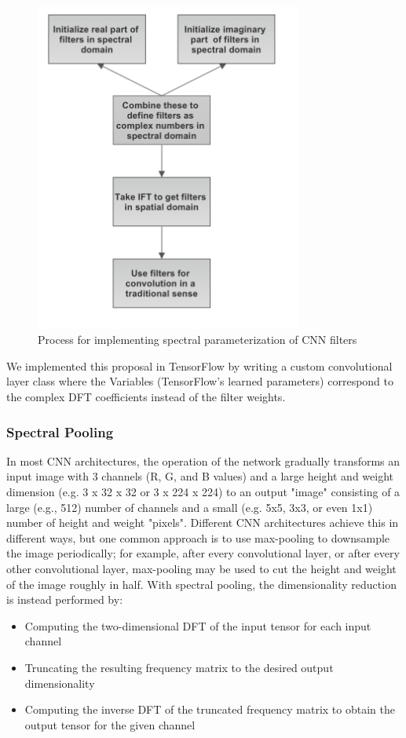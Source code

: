 \documentclass[10pt,journal,compsoc]{IEEEtran}
\begin{document}
\begin{figure}[ht]
\centering
  \includegraphics[width=250pt]{images/fc_spectral_param.png}
  \caption{Process for implementing spectral parameterization of CNN filters}
  \label{fig:spec_param}
\end{figure}

We implemented this proposal in TensorFlow by writing a custom convolutional layer class where the Variables (TensorFlow's learned parameters) correspond to the complex DFT coefficients instead of the filter weights.

\subsubsection{Spectral Pooling}

In most CNN architectures, the operation of the network gradually transforms an input image with 3 channels (R, G, and B values) and a large height and weight dimension (e.g. 3 x 32 x 32 or 3 x 224 x 224) to an output "image" consisting of a large (e.g., 512) number of channels and a small (e.g. 5x5, 3x3, or even 1x1) number of height and weight "pixels". Different CNN architectures achieve this in different ways, but one common approach is to use max-pooling to downsample the image periodically; for example, after every convolutional layer, or after every other convolutional layer, max-pooling may be used to cut the height and weight of the image roughly in half. With spectral pooling, the dimensionality reduction is instead performed by:
\begin{itemize}
\item Computing the two-dimensional DFT of the input tensor for each input channel
\item Truncating the resulting frequency matrix to the desired output dimensionality
\item Computing the inverse DFT of the truncated frequency matrix to obtain the output tensor for the given channel
\end{itemize}
\end{document}
